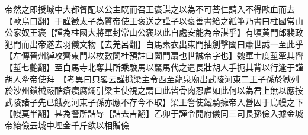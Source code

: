 帝然之即授城中大都督配以公主既而召王褒謀之以為不可荅仁請入不得歐血而去【歐烏口翻】于謹徵太子為質帝使王褒送之謹子以褒善書給之紙筆乃書曰柱國常山公家奴王褒【謹為柱國大將軍封常山公褒以此自處安能為帝謀乎】有頃黄門郎裴政犯門而出帝遂去羽儀文物【去羌呂翻】白馬素衣出東門抽劍擊闔曰蕭世誠一至此乎【左傳晉州綽攻齊東門以枚數闔杜預註曰闔門扇也世誠帝字也】魏軍士度塹牽其轡【塹七艶翻】至白馬寺北奪其所乘駿馬以駑馬代之遣長壯胡人手扼其背以行逢于謹胡人牽帝使拜　【考異曰典畧云謹撝梁主令西至龍泉廟出武陵河東二王子孫於獄列於沙州鎻械嚴酷瘡痍腐爛引梁主使視之謂曰此皆骨肉忍虐如此何以為君上無以應按武陵諸子先已餓死河東子孫亦應不存今不取】梁王詧使鐵騎擁帝入營囚于烏幔之下【幔莫半翻】甚為詧所詰辱【詰去吉翻】乙卯于謹令開府儀同三司長孫儉入據金城帝紿儉云城中埋金千斤欲以相贈儉